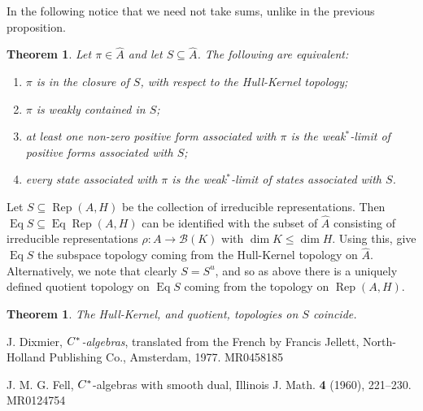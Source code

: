 \documentclass[a4paper,11pt]{article}
\newcommand{\mc}[1]{{\mathcal{#1}}}
\newcommand{\Rep}{\operatorname{Rep}}
\newcommand{\Eq}{\operatorname{Eq}}
\newtheorem{theorem}[lemma]{Theorem}
\begin{document}
In the following notice that we need not take sums, unlike in the previous
proposition.

\begin{theorem}
Let $\pi\in\hat A$ and let $S\subseteq\hat A$.  The following are equivalent:
\begin{enumerate}
\item $\pi$ is in the closure of $S$, with respect to the Hull-Kernel
topology;
\item $\pi$ is weakly contained in $S$;
\item at least one non-zero positive form associated with $\pi$ is the
weak$^*$-limit of positive forms associated with $S$;
\item every state associated with $\pi$ is the weak$^*$-limit of states
associated with $S$.
\end{enumerate}
\end{theorem}

Let $S\subseteq\Rep(A,H)$ be the collection of irreducible representations.
Then $\Eq S \subseteq \Eq\Rep(A,H)$ can be identified
with the subset of $\hat A$ consisting of irreducible representations
$\rho:A\rightarrow\mc B(K)$ with $\dim K\leq\dim H$.  Using this, give
$\Eq S$ the subspace topology coming from the Hull-Kernel topology on $\hat A$.
Alternatively, we note that clearly $S = S^u$, and so as above there is a
uniquely defined quotient topology on $\Eq S$ coming from the topology
on $\Rep(A,H)$.

\begin{theorem}
The Hull-Kernel, and quotient, topologies on $S$ coincide.
\end{theorem}


\begin{thebibliography}{99}

 J. Dixmier, {\it $C\sp*$-algebras}, translated from the French by Francis Jellett, North-Holland Publishing Co., Amsterdam, 1977. MR0458185

 J. M. G. Fell, $C\sp{\ast} $-algebras with smooth dual, Illinois J. Math. {\bf 4} (1960), 221--230. MR0124754

\end{thebibliography}
\end{document}
